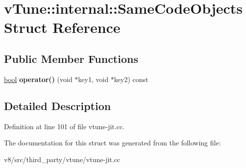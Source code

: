 \hypertarget{structvTune_1_1internal_1_1SameCodeObjects}{}\section{v\+Tune\+:\+:internal\+:\+:Same\+Code\+Objects Struct Reference}
\label{structvTune_1_1internal_1_1SameCodeObjects}
\subsection*{Public Member Functions}
\begin{DoxyCompactItemize}
\item 
\mbox{\label{structvTune_1_1internal_1_1SameCodeObjects_a847c52e5c497913b422b44945d404d92}} 
\mbox{\hyperlink{classbool}{bool}} {\bfseries operator()} (void $\ast$key1, void $\ast$key2) const
\end{DoxyCompactItemize}


\subsection{Detailed Description}


Definition at line 101 of file vtune-\/jit.\+cc.



The documentation for this struct was generated from the following file\+:\begin{DoxyCompactItemize}
\item 
v8/src/third\+\_\+party/vtune/vtune-\/jit.\+cc\end{DoxyCompactItemize}
